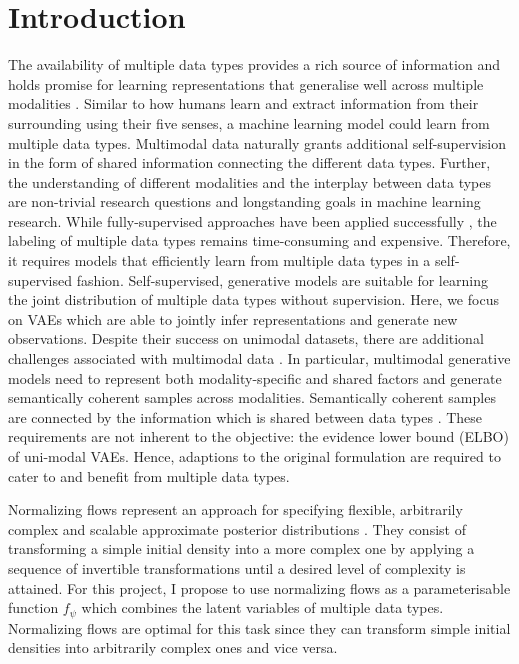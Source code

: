 \section{Introduction}

The availability of multiple data types provides a rich source of information and holds promise for learning representations that generalise well across multiple modalities \parencite{baltrusaitis_multimodal_2019}.
Similar to how humans learn and extract information from their surrounding using their five senses, a machine learning model could learn from multiple data types.
Multimodal data naturally grants additional self-supervision in the form of shared information connecting the different data types.
Further, the understanding of different modalities and the interplay between data types are non-trivial research questions and longstanding goals in machine learning research.
While fully-supervised approaches have been applied successfully \parencite{karpathy_deep_2015,tsai_learning_2018}, the labeling of multiple data types remains time-consuming and expensive.
Therefore, it requires models that efficiently learn from multiple data types in a self-supervised fashion.
Self-supervised, generative models are suitable for learning the joint distribution of multiple data types without supervision.
Here, we focus on VAEs \parencite{kingma_auto-encoding_2014,rezende_stochastic_2014} which are able to jointly infer representations and generate new observations.
Despite their success on unimodal datasets, there are additional challenges associated with multimodal data \parencite{suzuki_joint_2016, vedantam_generative_2018}.
In particular, multimodal generative models need to represent both modality-specific and shared factors and generate semantically coherent samples across modalities.
Semantically coherent samples are connected by the information which is shared between data types \parencite{shi_variational_2019}.
These requirements are not inherent to the objective: the evidence lower bound (ELBO) of uni-modal VAEs.
Hence, adaptions to the original formulation are required to cater to and benefit from multiple data types.

Normalizing flows represent an approach for specifying flexible, arbitrarily complex and scalable approximate posterior distributions \parencite{papamakarios_normalizing_2019,rezende_variational_2016}.
They consist of transforming a simple initial density into a more complex one by applying a sequence of invertible transformations until a desired level of complexity is attained.
For this project, I propose to use normalizing flows as a parameterisable function $f_\psi$ which combines the latent variables of multiple data types.
Normalizing flows are optimal for this task since they can transform simple initial densities into arbitrarily complex ones and vice versa.

